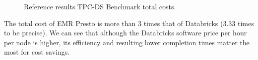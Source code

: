 \begin{figure}
   \begin{center}
   \end{center}
   \caption{Reference results TPC-DS Benchmark total costs.}
   \label{fig:referenceResultsTotalCosts}
\end{figure}

The total cost of EMR Presto is more than 3 times that of Databricks (3.33 times to be precise). We can see that although the Databricks software price per hour per node is higher, its efficiency and resulting lower completion times matter the most for cost savings.



